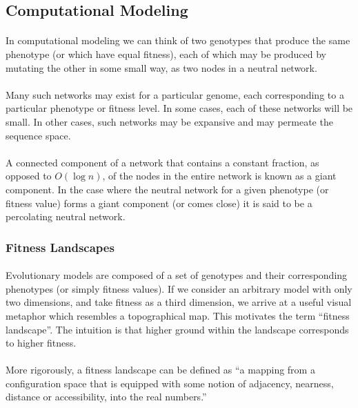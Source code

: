 \documentclass[12pt,letterpaper,titlepage]{article}
\begin{document}
\subsection{Computational Modeling}

\paragraph{}
In computational modeling we can think of two genotypes that produce the same
phenotype (or which have equal fitness), each of which may be produced by
mutating the other in some small way, as two nodes in a neutral network.

\paragraph{}
Many such networks may exist for a particular genome, each corresponding to a
particular phenotype or fitness level. In some cases, each of these networks
will be small. In other cases, such networks may be expansive and may permeate
the sequence space.

\paragraph{}
A connected component of a network that contains a constant fraction, as
opposed to $O\left(\log n\right)$, of the nodes in the entire network is known
as a giant component. In the case where the neutral network for a given
phenotype (or fitness value) forms a giant component (or comes close) it is
said to be a percolating neutral network.

\subsubsection{Fitness Landscapes}

\paragraph{}
Evolutionary models are composed of a set of genotypes and their corresponding
phenotypes (or simply fitness values).  If we consider an arbitrary model with
only two dimensions, and take fitness as a third dimension, we arrive at a
useful visual metaphor which resembles a topographical map. This motivates the
term ``fitness landscape''. The intuition is that higher ground within the
landscape corresponds to higher fitness.

\paragraph{}
More rigorously, a fitness landscape can be defined as ``a mapping from a
configuration space that is equipped with some notion of adjacency, nearness,
distance or accessibility, into the real numbers.''~\cite{Calcott2008}
\end{document}
